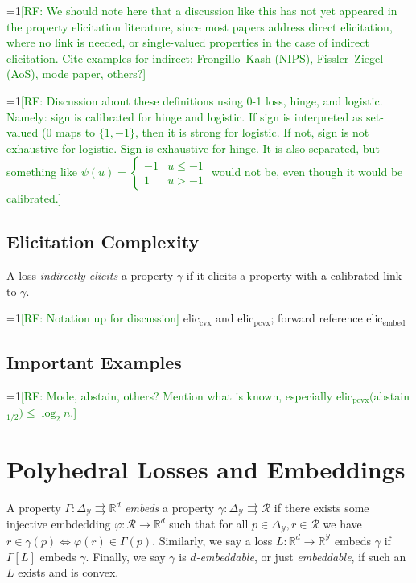 \documentclass[11pt]{colt2019}
\newcommand{\Comments}{1}
\newcommand{\mynote}[2]{\ifnum\Comments=1\textcolor{#1}{#2}\fi}
\newcommand{\raf}[1]{\mynote{green}{[RF: #1]}}
\newcommand{\reals}{\mathbb{R}}
\newcommand{\prop}[1]{\Gamma[#1]}
\newcommand{\eliccvx}{\mathrm{elic}_\mathrm{cvx}}
\newcommand{\elicpoly}{\mathrm{elic}_\mathrm{pcvx}}
\newcommand{\elicembed}{\mathrm{elic}_\mathrm{embed}}
\newcommand{\simplex}{\Delta_\Y}
\newcommand{\R}{\mathcal{R}}
\newcommand{\Y}{\mathcal{Y}}
\newcommand{\toto}{\rightrightarrows}
\begin{document}
\raf{We should note here that a discussion like this has not yet appeared in the property elicitation literature, since most papers address direct elicitation, where no link is needed, or single-valued properties in the case of indirect elicitation.  Cite examples for indirect: Frongillo--Kash (NIPS), Fissler--Ziegel (AoS), mode paper, others?}

\raf{Discussion about these definitions using 0-1 loss, hinge, and logistic.  Namely: sign is calibrated for hinge and logistic.  If sign is interpreted as set-valued (0 maps to $\{1,-1\}$, then it is strong for logistic.  If not, sign is not exhaustive for logistic.  Sign is exhaustive for hinge.  It is also separated, but something like $\psi(u) =
  \begin{cases}
    -1 & u \leq -1\\
    1 & u > -1
  \end{cases}$
  would not be, even though it would be calibrated.}


\subsection{Elicitation Complexity}

\begin{definition}
  A loss \emph{indirectly elicits} a property $\gamma$ if it elicits a property with a calibrated link to $\gamma$.
\end{definition}

\raf{Notation up for discussion}
$\eliccvx$ and $\elicpoly$; forward reference $\elicembed$

\subsection{Important Examples}
\raf{Mode, abstain, others?  Mention what is known, especially $\elicpoly($abstain$_{1/2}) \leq \log_2 n$.}

\section{Polyhedral Losses and Embeddings}

\begin{definition}
  A property $\Gamma : \simplex \toto \reals^d$ \emph{embeds} a property $\gamma : \simplex \toto \R$ if there exists some injective embdedding $\varphi:\R\to\reals^d$ such that for all $p\in\simplex,r\in\R$ we have $r \in \gamma(p) \iff \varphi(r) \in \Gamma(p)$.
  Similarly, we say a loss $L:\reals^d\to\reals^\Y$ embeds $\gamma$ if $\prop{L}$ embeds $\gamma$.
  Finally, we say $\gamma$ is \emph{$d$-embeddable}, or just \emph{embeddable}, if such an $L$ exists and is convex.
\end{definition}
\end{document}
